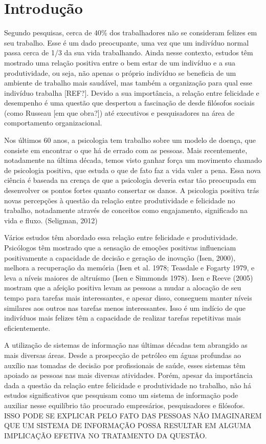 \chapter*[Introdução]{Introdução}

Segundo pesquisas, cerca de 40\% dos trabalhadores não se consideram felizes em seu trabalho. Esse é um dado preocupante, uma vez que um indivíduo normal passa cerca de 1/3 da sua vida trabalhando. Ainda nesse contexto, estudos têm mostrado uma relação positiva entre o bem estar de um indivíduo e a sua produtividade, ou seja, não apenas o próprio indivíduo se beneficia de um ambiente de trabalho mais saudável, mas também a organização para qual esse indivíduo trabalha [REF?]. Devido a sua importância, a relação entre felicidade e desempenho é uma questão que despertou a fascinação de desde filósofos sociais (como Russeau [em que obra?]) até executivos e pesquisadores na área de comportamento organizacional.

Nos últimos 60 anos, a psicologia tem trabalho sobre um modelo de doença, que consiste em encontrar o que há de errado com as pessoas. Mais recentemente, notadamente na última década, temos visto ganhar força um movimento chamado de psicologia positiva, que estuda o que de fato faz a vida valer a pena. Essa nova ciência é baseada na crença de que a psicologia deveria estar tão preocupada em desenvolver os pontos fortes quanto consertar os danos. A psicologia positiva trás novas percepções à questão da relação entre produtividade e felicidade no trabalho, notadamente através de conceitos como engajamento, significado na vida e fluxo. (Seligman, 2012)

Vários estudos têm abordado essa relação entre felicidade e produtividade. Psicólogos têm mostrado que a sensação de emoções positivas influenciam positivamente a capacidade de decisão e geração de inovação (Isen, 2000), melhora a recuperação da memória (Isen et al. 1978; Teasdale e Fogarty 1979, e leva a níveis maiores de altruísmo (Isen e Simmonds 1978). Isen e Reeve (2005) mostram que a afeição positiva levam as pessoas a mudar a alocação de seu tempo para tarefas mais interessantes, e apesar disso, conseguem manter níveis similares aos outros nas tarefas menos interessantes. Isso é um indício de que indivíduos mais felizes têm a capacidade de realizar tarefas repetitivas mais eficientemente.

A utilização de sistemas de informação nas últimas décadas tem abrangido as mais diversas áreas. Desde a prospecção de petróleo em águas profundas ao auxílio nas tomadas de decisão por profissionais de saúde, esses sistemas têm apoiado as pessoas nas mais diversas atividades. Porém, apesar da importância dada a questão da relação entre felicidade e produtividade no trabalho, não há estudos significativos que pesquisam como um sistema de informação pode auxiliar nesse equilíbrio tão procurado empresários, pesquisadores e filósofos. ISSO PODE SE EXPLICAR PELO FATO DAS PESSOAS NÃO IMAGINAREM QUE UM SISTEMA DE INFORMAÇÃO POSSA RESULTAR EM ALGUMA IMPLICAÇÃO EFETIVA NO TRATAMENTO DA QUESTÃO. 

